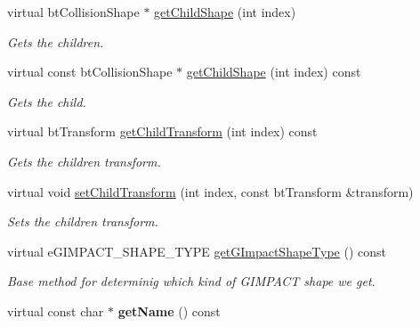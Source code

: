 \begin{DoxyCompactItemize}
virtual bt\+Collision\+Shape $\ast$ \hyperlink{classbtGImpactMeshShape_ae268fb9f2813b1fa4171d87e201c37a7}{get\+Child\+Shape} (int index)
\begin{DoxyCompactList}\small\item\em Gets the children. \end{DoxyCompactList}\item 
\mbox{\label{classbtGImpactMeshShape_a7f749f41c8d64e74778d18fda553cfdb}} 
virtual const bt\+Collision\+Shape $\ast$ \hyperlink{classbtGImpactMeshShape_a7f749f41c8d64e74778d18fda553cfdb}{get\+Child\+Shape} (int index) const
\begin{DoxyCompactList}\small\item\em Gets the child. \end{DoxyCompactList}\item 
\mbox{\label{classbtGImpactMeshShape_a413c40feffbdb494f8c7f9a4810e89e9}} 
virtual bt\+Transform \hyperlink{classbtGImpactMeshShape_a413c40feffbdb494f8c7f9a4810e89e9}{get\+Child\+Transform} (int index) const
\begin{DoxyCompactList}\small\item\em Gets the children transform. \end{DoxyCompactList}\item 
virtual void \hyperlink{classbtGImpactMeshShape_a274feed3c9a38a6af5c9f1141ae9ac1a}{set\+Child\+Transform} (int index, const bt\+Transform \&transform)
\begin{DoxyCompactList}\small\item\em Sets the children transform. \end{DoxyCompactList}\item 
virtual e\+G\+I\+M\+P\+A\+C\+T\+\_\+\+S\+H\+A\+P\+E\+\_\+\+T\+Y\+PE \hyperlink{classbtGImpactMeshShape_ac48641f3b35339f6de0716197bbbe302}{get\+G\+Impact\+Shape\+Type} () const
\begin{DoxyCompactList}\small\item\em Base method for determinig which kind of G\+I\+M\+P\+A\+CT shape we get. \end{DoxyCompactList}\item 
\mbox{\label{classbtGImpactMeshShape_afdc1bc83b210d4d6c2fb4306d9c841bf}} 
virtual const char $\ast$ {\bfseries get\+Name} () const
\item 
\mbox{\label{classbtGImpactMeshShape_ab81808ab81daed3022bcff460c797175}} 

\end{DoxyCompactItemize}
